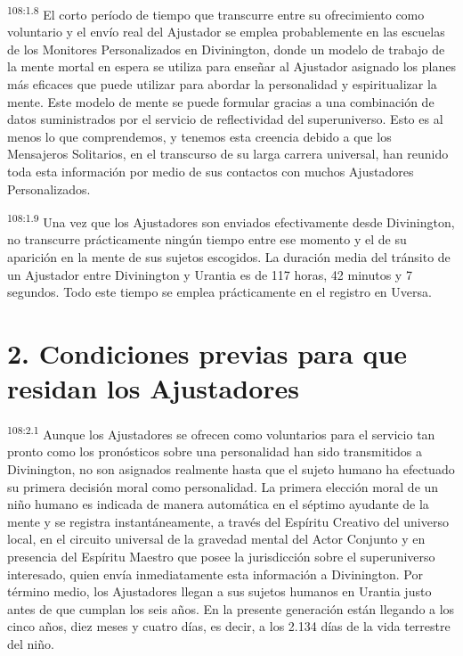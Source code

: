 \documentclass[twoside, 11pt]{book}
\begin{document}
\par
\textsuperscript{108:1.8} El corto período de tiempo que transcurre entre su ofrecimiento como voluntario y el envío real del Ajustador se emplea probablemente en las escuelas de los Monitores Personalizados en Divinington, donde un modelo de trabajo de la mente mortal en espera se utiliza para enseñar al Ajustador asignado los planes más eficaces que puede utilizar para abordar la personalidad y espiritualizar la mente. Este modelo de mente se puede formular gracias a una combinación de datos suministrados por el servicio de reflectividad del superuniverso. Esto es al menos lo que comprendemos, y tenemos esta creencia debido a que los Mensajeros Solitarios, en el transcurso de su larga carrera universal, han reunido toda esta información por medio de sus contactos con muchos Ajustadores Personalizados.

\par
\textsuperscript{108:1.9} Una vez que los Ajustadores son enviados efectivamente desde Divinington, no transcurre prácticamente ningún tiempo entre ese momento y el de su aparición en la mente de sus sujetos escogidos. La duración media del tránsito de un Ajustador entre Divinington y Urantia es de 117 horas, 42 minutos y 7 segundos. Todo este tiempo se emplea prácticamente en el registro en Uversa.

\section*{2. Condiciones previas para que residan los Ajustadores}
\par
\textsuperscript{108:2.1} Aunque los Ajustadores se ofrecen como voluntarios para el servicio tan pronto como los pronósticos sobre una personalidad han sido transmitidos a Divinington, no son asignados realmente hasta que el sujeto humano ha efectuado su primera decisión moral como personalidad. La primera elección moral de un niño humano es indicada de manera automática en el séptimo ayudante de la mente y se registra instantáneamente, a través del Espíritu Creativo del universo local, en el circuito universal de la gravedad mental del Actor Conjunto y en presencia del Espíritu Maestro que posee la jurisdicción sobre el superuniverso interesado, quien envía inmediatamente esta información a Divinington. Por término medio, los Ajustadores llegan a sus sujetos humanos en Urantia justo antes de que cumplan los seis años. En la presente generación están llegando a los cinco años, diez meses y cuatro días, es decir, a los 2.134 días de la vida terrestre del niño.
\end{document}
